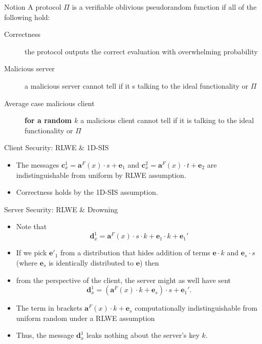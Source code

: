\documentclass[xcolor=table,10pt,aspectratio=169]{beamer}
\begin{document}
\begin{frame}[label={sec:orgd531389}]{Notion}
A protocol \(\Pi\) is a verifiable oblivious pseudorandom function if all of the following hold:

\begin{description}
\item[{Correctness}] the protocol outputs the correct evaluation with overwhelming probability
\item[{Malicious server}] a malicious server cannot tell if it s talking to the ideal functionality or \(\Pi\)
\item[{Average case malicious client}] \textbf{for a random \(k\)} a malicious client cannot tell if it is talking to the ideal functionality or \(\Pi\)
\end{description}
\end{frame}

\begin{frame}[label={sec:org767252a}]{Client Security: RLWE \& 1D-SIS}
\begin{itemize}
\item The messages \(\mathbf{c}_x^1 = \mathbf{a}^F(x) \cdot s + \mathbf{e}_1\) and  \(\mathbf{c}_x^2 = \mathbf{a}^F(x) \cdot t + \mathbf{e}_2\) are indistinguishable from uniform by RLWE assumption.
\item Correctness holds by the 1D-SIS assumption.
\end{itemize}
\end{frame}

\begin{frame}[label={sec:orgffd75af}]{Server Security: RLWE \& Drowning}
\begin{itemize}
\item Note that \[\mathbf{d}_x^1 = \mathbf{a}^F(x) \cdot s \cdot  k + \mathbf{e}_1 \cdot k + \mathbf{e}_1'\]
\item If we pick \(\mathbf{e}'_1\) from a distribution that hides addition of terms \(\mathbf{e} \cdot k\) and \(\mathbf{e}_s \cdot s\) (where \(\mathbf{e}_s\) is identically distributed to \(\mathbf{e}\)) then
\item from the perspective of the client, the server might as well have sent \[\mathbf{d}_x^1 = (\mathbf{a}^F(x) \cdot k + \mathbf{e}_s) \cdot s + \mathbf{e}_1'.\]
\item The term in brackets \(\mathbf{a}^F(x) \cdot k + \mathbf{e}_s\) computationally indistinguishable from uniform random under a RLWE assumption
\item Thus, the message \(\mathbf{d}_x^1\) leaks nothing about the server's key \(k\).
\end{itemize}
\end{frame}
\end{document}
